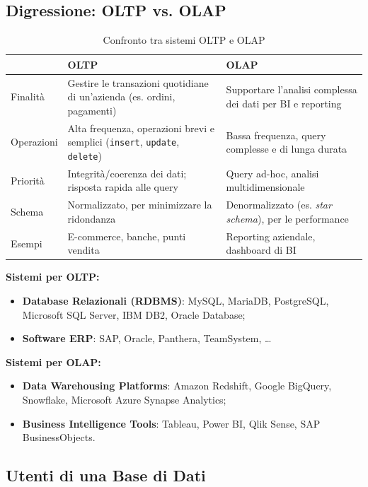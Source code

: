 \documentclass[12pt, a4paper]{article}
\begin{document}
\subsection{Digressione: OLTP vs. OLAP}

\begin{table}[H]
\centering
\begin{tabular}{@{}p{2.7cm}p{5.3cm}p{5.3cm}@{}}
\toprule
 & \textbf{OLTP} & \textbf{OLAP} \\
\midrule
Finalità & Gestire le transazioni quotidiane di un'azienda (es. ordini, pagamenti) & Supportare l'analisi complessa dei dati per BI e reporting \\
Operazioni & Alta frequenza, operazioni brevi e semplici (\texttt{insert}, \texttt{update}, \texttt{delete}) & Bassa frequenza, query complesse e di lunga durata \\
Priorità & Integrità/coerenza dei dati; risposta rapida alle query & Query ad-hoc, analisi multidimensionale \\
Schema & Normalizzato, per minimizzare la ridondanza & Denormalizzato (es. \textit{star schema}), per le performance \\
Esempi & E-commerce, banche, punti vendita & Reporting aziendale, dashboard di BI \\
\bottomrule
\end{tabular}
\caption{Confronto tra sistemi OLTP e OLAP}
\end{table}

\textbf{Sistemi per OLTP:}
\begin{itemize}
    \item \textbf{Database Relazionali (RDBMS)}: MySQL, MariaDB, PostgreSQL, Microsoft SQL Server, IBM DB2, Oracle Database;
    \item \textbf{Software ERP}: SAP, Oracle, Panthera, TeamSystem, \ldots
\end{itemize}

\textbf{Sistemi per OLAP:}
\begin{itemize}
    \item \textbf{Data Warehousing Platforms}: Amazon Redshift, Google BigQuery, Snowflake, Microsoft Azure Synapse Analytics;
    \item \textbf{Business Intelligence Tools}: Tableau, Power BI, Qlik Sense, SAP BusinessObjects.
\end{itemize}

\subsection{Utenti di una Base di Dati}
\end{document}

